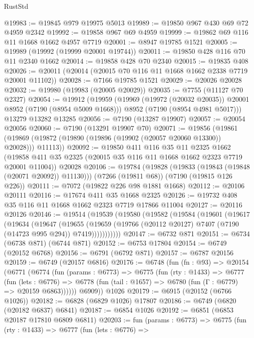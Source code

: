 \begin{lexlean}{RustStd}
\begin{coremodule}
@19983 := @19845 @979 @19975 @5013
@19989 := @19850 @967 @430 @69 @72 @4959 @2342
@19992 := @19858 @967 @69 @4959
@19999 := @19862 @69 @116 @11 @1668 @1662 @4957 @7719
@20001 := @8947 @19785 @1521
@20005 := @19989 (@19992 (@19999 @20001 @19744))
@20011 := @19850 @428 @116 @70 @11 @2340 @1662
@20014 := @19858 @428 @70 @2340
@20015 := @19835 @408
@20026 := @20011 (@20014 (@20015 @70 @116 @11 @1668 @1662 @2338 @7719 @20001 @11102))
@20028 := @7166 @19785 @1521
@20029 := @20026 @20028
@20032 := @19980 (@19983 (@20005 @20029))
@20035 := @7755 (@11127 @70 @2327)
@20054 := @19912
    (@19959
      (@19969 (@19972 (@20032 @20035)) @20001 @8952 (@7190 (@8954 @5009 @1668)))
      @8952
      (@7190 (@8954 @4981 @5017)))
    @13279
    @13282
    @13285
@20056 := @7190 (@13287 @19907)
@20057 := @20054 @20056
@20060 := @7190 (@13291 @19907 @70)
@20071 := @19856
    (@19861 (@19869 (@19872 (@19890 (@19896 (@19902 (@20057 @20060 @13300)) @20028))) @11113))
@20092 := @19850
    @411
    @116
    @35
    @11
    @2325
    @1662
    (@19858 @411 @35 @2325 (@20015 @35 @116 @11 @1668 @1662 @2323 @7719 @20001 @11004))
    @20028
@20106 := @19784
    (@19828 (@19833 (@19843 (@19848 (@20071 @20092)) @11130)))
    (@7266 (@19811 @68))
    (@7190 (@19815 @126 @226))
@20111 := @7072 (@19822 @226 @98 @1881 @1668)
@20112 := @20106 @20111
@20116 := @17674 @411 @35 @1668 @2325
@20126 := @19732 @408 @35 @116 @11 @1668 @1662 @2323 @7719 @17866 @11004
@20127 := @20116 @20126
@20146 := @19514
    (@19539
      (@19580
        (@19582
          (@19584
            (@19601
              (@19617
                (@19634
                  (@19647
                    (@19655
                      (@19659
                        (@19766 (@20112 @20127) @7407 (@7190 (@14723 @995 @294)) @7419)))))))))))
@20147 := @6732 @871
@20151 := @6734 (@6738 @871) (@6744 @871)
@20152 := @6753 @17804
@20154 := @6749 (@20152 @6768)
@20156 := @6791 (@6792 @871)
@20157 := @6787 @20156
@20159 := @6749 (@20157 @6816)
@20176 := @6748
    (fun (fn : @93) =>
    @20154
      (@6771
        (@6774
          (fun (params : @6773) =>
          @6775
            (fun (rty : @1433) =>
            @6777
              (fun (lets : @6776) =>
              @6778 (fun (tail : @1657) => @6780 (fun (Γ : @6779) => @20159 @6863))))))
        @6909))
    @1026
@20179 := @6915 (@20152 (@6766 @1026))
@20182 := @6828 (@6829 @1026) @17807
@20186 := @6749 (@6820 (@20182 @6837) @6841)
@20187 := @6854 @1026
@20192 := @6851 (@6853 @20187 @17810 @6809 @6811)
@20203 := fun (params : @6773) =>
  @6775
    (fun (rty : @1433) =>
    @6777
      (fun (lets : @6776) =>

\end{coremodule}
\end{lexlean}
